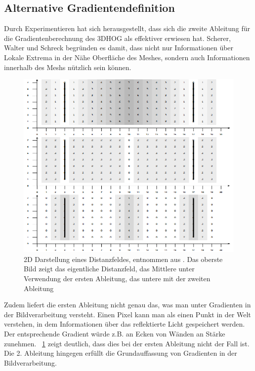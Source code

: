 \subsection{Alternative Gradientendefinition}
Durch Experimentieren hat sich herausgestellt, dass sich die zweite Ableitung für die Gradientenberechnung des 3DHOG als effektiver erwiesen hat. Scherer, Walter und Schreck \cite{scherer2010histograms} begründen es damit, dass nicht nur Informationen über Lokale Extrema in der Nähe Oberfläche des Meshes, sondern auch Informationen innerhalb des Meshs nützlich sein können. 
 \begin{figure}[thpb]
 	\centering
 	\includegraphics[width=\linewidth]{3-Diskussion/pics/2D_distance_field.png}
 	\caption{2D Darstellung eines Distanzfeldes, entnommen aus \cite{scherer2010histograms}. Das oberste Bild zeigt das eigentliche Distanzfeld, das Mittlere unter Verwendung der ersten Ableitung, das untere mit der zweiten Ableitung}
 	\label{2D_distance_field}
 \end{figure}
 Zudem liefert die ersten Ableitung nicht genau das, was man unter Gradienten in der Bildverarbeitung versteht. Einen Pixel kann man als einen Punkt in der Welt verstehen, in dem Informationen über das reflektierte Licht gespeichert werden. Der entsprechende Gradient würde z.B. an Ecken von Wänden an Stärke zunehmen. \figurename~\ref{2D_distance_field} zeigt deutlich, dass dies bei der ersten Ableitung nicht der Fall ist. Die 2. Ableitung hingegen erfüllt die Grundauffassung von Gradienten in der Bildverarbeitung.
 \newline
 
 
